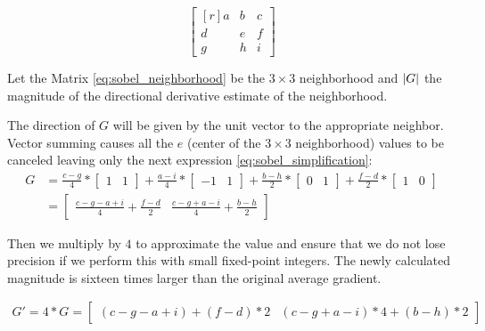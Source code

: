 \documentclass{cslthse-msc}
\DeclarePairedDelimiter\abs{\lvert}{\rvert}%
\begin{document}
\begin{equation}
\begin{bmatrix*}[r]\label{eq:sobel_neighborhood}
a & b & c \\
d & e & f \\
g & h & i
\end{bmatrix*}
\end{equation}

Let the Matrix \ref{eq:sobel_neighborhood} be the $3\times 3$ neighborhood and $\abs*{G}$ the magnitude of the directional derivative estimate of the neighborhood.  

The direction of $G$ will be given by the unit vector to the appropriate neighbor. Vector summing causes all the $e$ (center of the $3\times 3$ neighborhood) values to be canceled leaving only the next expression \ref{eq:sobel_simplification}:
\begin{equation}\label{eq:sobel_simplification}
\begin{split}
	G & =\frac{c-g}{4}*\begin{bmatrix*}1 & 1\end{bmatrix*}+\frac{a-i}{4}*\begin{bmatrix*}-1 & 1\end{bmatrix*}+\frac{b-h}{2}*\begin{bmatrix*}0 & 1\end{bmatrix*}+\frac{f-d}{2}*\begin{bmatrix*}1 & 0\end{bmatrix*} \\ & =\begin{bmatrix*}\frac{c-g-a+i}{4}+\frac{f-d}{2} & \frac{c-g+a-i}{4}+\frac{b-h}{2}\end{bmatrix*}
\end{split}
\end{equation}

Then we multiply by $4$ to approximate the value and ensure that we do not lose precision if we perform this with small fixed-point integers. The newly calculated magnitude is sixteen times larger than the original average gradient.

\begin{equation}\label{eq:sobel_approximation}
\begin{split}
G' = 4 * G =\begin{bmatrix*}(c-g-a+i)+(f-d)*2 & (c-g+a-i)*4+(b-h)*2\end{bmatrix*}
\end{split}
\end{equation}
\end{document}
